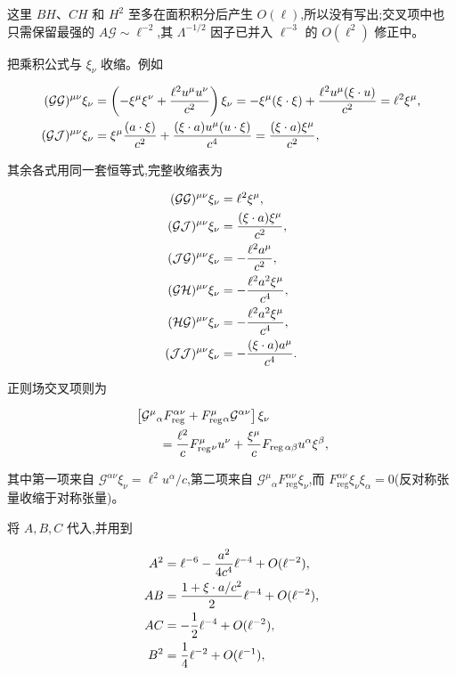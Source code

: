 这里 $BH$、$CH$ 和 $H^2$ 至多在面积积分后产生 $O(\ell)$,所以没有写出;交叉项中也只需保留最强的 $A\mathcal G\sim\ell^{-2}$,其 $\Lambda^{-1/2}$ 因子已并入 $\ell^{-3}$ 的 $O(\ell^2)$ 修正中。

把乘积公式与 $\xi_\nu$ 收缩。例如

\begin{align*}
 (\mathcal G\mathcal G)^{\mu\nu}\xi_\nu
 &=\left(-\xi^\mu\xi^\nu+{\ell^2u^\mu u^\nu\over c^2}\right)\xi_\nu
 =-\xi^\mu(\xi\cdot\xi)+{\ell^2u^\mu(\xi\cdot u)\over c^2}
 =\ell^2\xi^\mu,\\
 (\mathcal G\mathcal J)^{\mu\nu}\xi_\nu
 &=\xi^\mu{(a\cdot\xi)\over c^2}+{(\xi\cdot a)u^\mu(u\cdot\xi)\over c^4}
 ={(\xi\cdot a)\xi^\mu\over c^2},
\end{align*}

其余各式用同一套恒等式,完整收缩表为

\begin{align*}
 (\mathcal G\mathcal G)^{\mu\nu}\xi_\nu
 &=\ell^2\xi^\mu,\\
 (\mathcal G\mathcal J)^{\mu\nu}\xi_\nu
 &={(\xi\cdot a)\xi^\mu\over c^2},\\
 (\mathcal J\mathcal G)^{\mu\nu}\xi_\nu
 &=-{\ell^2a^\mu\over c^2},\\
 (\mathcal G\mathcal H)^{\mu\nu}\xi_\nu
 &=-{\ell^2a^2\xi^\mu\over c^4},\\
 (\mathcal H\mathcal G)^{\mu\nu}\xi_\nu
 &=-{\ell^2a^2\xi^\mu\over c^4},\\
 (\mathcal J\mathcal J)^{\mu\nu}\xi_\nu
 &=-{(\xi\cdot a)a^\mu\over c^4}.
\end{align*}

正则场交叉项则为

\begin{align*}
 &\left[
 \mathcal G^\mu{}_\alpha F_{\mathrm{reg}}^{\alpha\nu}
 +F_{\mathrm{reg}}^\mu{}_\alpha\mathcal G^{\alpha\nu}
 \right]\xi_\nu\\
 &\qquad
 ={\ell^2\over c}F_{\mathrm{reg}}^\mu{}_\nu u^\nu
 +{\xi^\mu\over c}F_{\mathrm{reg}\,\alpha\beta}u^\alpha\xi^\beta,
\end{align*}

其中第一项来自 $\mathcal G^{\alpha\nu}\xi_\nu=\ell^2u^\alpha/c$,第二项来自 $\mathcal G^\mu{}_\alpha F_{\mathrm{reg}}^{\alpha\nu}\xi_\nu$,而 $F_{\mathrm{reg}}^{\alpha\nu}\xi_\nu\xi_\alpha=0$(反对称张量收缩于对称张量)。

将 $A,B,C$ 代入,并用到

\begin{align*}
 A^2&=\ell^{-6}-{a^2\over4c^4}\ell^{-4}+O(\ell^{-2}),\\
 AB&={1+\xi\cdot a/c^2\over2}\ell^{-4}+O(\ell^{-2}),\\
 AC&=-{1\over2}\ell^{-4}+O(\ell^{-2}),\\
 B^2&={1\over4}\ell^{-2}+O(\ell^{-1}),
\end{align*}

